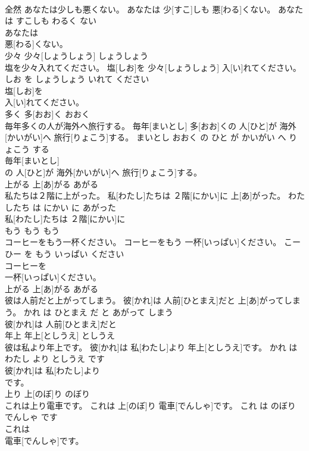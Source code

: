 \documentclass[8pt]{extreport}
\begin{document}
\begin{CJK}{UTF8}{min}
\\	全然	あなたは少しも悪くない。	あなたは 少[すこ]しも 悪[わる]くない。	あなた は すこしも わるく ない	
\\	あなたは
\\	悪[わる]くない。		
\\	少々	少々[しょうしょう]	しょうしょう	
\\	塩を少々入れてください。	塩[しお]を 少々[しょうしょう] 入[い]れてください。	しお を しょうしょう いれて ください	
\\	塩[しお]を
\\	入[い]れてください。		
\\	多く	多[おお]く	おおく	
\\	毎年多くの人が海外へ旅行する。	毎年[まいとし] 多[おお]くの 人[ひと]が 海外[かいがい]へ 旅行[りょこう]する。	まいとし おおく の ひと が かいがい へ りょこう する	
\\	毎年[まいとし]
\\	の 人[ひと]が 海外[かいがい]へ 旅行[りょこう]する。		
\\	上がる	上[あ]がる	あがる	
\\	私たちは２階に上がった。	私[わたし]たちは ２階[にかい]に 上[あ]がった。	わたしたち は にかい に あがった	
\\	私[わたし]たちは ２階[にかい]に
\\	もう	もう	もう	
\\	コーヒーをもう一杯ください。	コーヒーをもう 一杯[いっぱい]ください。	こーひー を もう いっぱい ください	
\\	コーヒーを
\\	一杯[いっぱい]ください。		
\\	上がる	上[あ]がる	あがる	
\\	彼は人前だと上がってしまう。	彼[かれ]は 人前[ひとまえ]だと 上[あ]がってしまう。	かれ は ひとまえ だ と あがって しまう	
\\	彼[かれ]は 人前[ひとまえ]だと
\\	年上	年上[としうえ]	としうえ	
\\	彼は私より年上です。	彼[かれ]は 私[わたし]より 年上[としうえ]です。	かれ は わたし より としうえ です	
\\	彼[かれ]は 私[わたし]より
\\	です。		
\\	上り	上[のぼ]り	のぼり	
\\	これは上り電車です。	これは 上[のぼ]り 電車[でんしゃ]です。	これ は のぼり でんしゃ です	
\\	これは
\\	電車[でんしゃ]です。		

\end{CJK}
\end{document}
